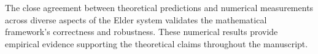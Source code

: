 The close agreement between theoretical predictions and numerical measurements across diverse aspects of the Elder system validates the mathematical framework's correctness and robustness. These numerical results provide empirical evidence supporting the theoretical claims throughout the manuscript.
